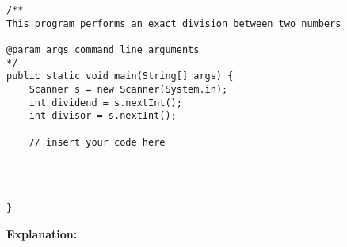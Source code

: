\begin{enumerate}
\begin{lstlisting}
/**
This program performs an exact division between two numbers

@param args command line arguments
*/
public static void main(String[] args) {
    Scanner s = new Scanner(System.in);
    int dividend = s.nextInt();
    int divisor = s.nextInt();
    
    // insert your code here
    
 
 
 
}
\end{lstlisting}

\textbf{Explanation: }


\end{enumerate}
